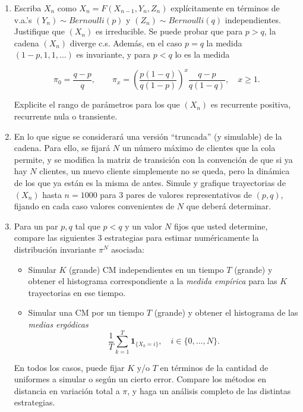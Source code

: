 \begin{enumerate}
    \item Escriba $X_n$ como $X_n = F (X_{n-1},Y_n,Z_n)$ explícitamente en términos de v.a.'s $(Y_n)\sim Bernoulli(p)$ y $(Z_n)\sim Bernoulli(q)$ independientes. Justifique que $(X_n)$ es irreducible. Se puede probar que para $p>q$, la cadena $(X_n)$ diverge c.s. Además, en el caso $p=q$ la medida $(1-p,1,1,\dots)$ es invariante, y para $p<q$ lo es la medida 

    $$ \pi_0 	= \frac{q-p}{q}, 	\qquad 	\pi_x 	= \left( \frac{p(1-q)}{q(1-p)} \right)^x 	\frac{q-p}{q(1-q)}, 	\quad x\geq 1.$$

    Explicite el rango de parámetros para los que $(X_n)$ es recurrente positiva, recurrente nula o transiente.
	
    \item En lo que sigue se considerará una versión ``truncada'' (y simulable) de la cadena. Para ello, se fijará $N$ un número máximo de clientes que la cola permite, y se modifica la matriz de transición con la convención de que si ya hay $N$ clientes, un nuevo cliente simplemente no se queda, pero la dinámica de los que ya están es la misma de antes. Simule y grafique trayectorias de $(X_n)$ hasta $n=1000$ para $3$ pares de
	valores representativos de $(p,q)$, fijando en cada caso valores convenientes de $N$ que deberá determinar.
	
    \item Para un par $p,q$ tal que $p<q$ y un valor $N$ fijos que usted determine, compare las siguientes 3 estrategias para estimar numéricamente la distribución invariante $\pi^N$ asociada:
	
	\begin{itemize}
		\item Simular $K$ (grande) CM independientes en un tiempo $T$ (grande) y obtener el histograma correspondiente a la \textit{medida empírica} para
		las $K$ trayectorias en ese tiempo.
		
		\item Simular una CM por un tiempo $T$ (grande) y obtener el histograma de las \textit{medias ergódicas} 
		$$ \frac{1}{T} \sum_{k=1}^T \mathbf{1}_{\{X_k=i\}}, \quad i\in \{0,...,N\}. $$
	\end{itemize}
	
	En todos los casos, puede fijar $K$ y/o $T$ en términos de la cantidad de uniformes a simular o según un cierto error. Compare los métodos en distancia en variación total a $\pi$, y haga un análisis completo de las distintas estrategias.
\end{enumerate}